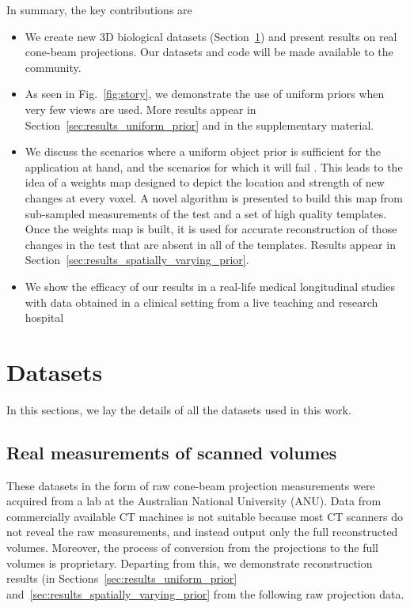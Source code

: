 \documentclass[journal]{IEEEtran}
\begin{document}
In summary, the key contributions are
\begin{itemize}
\item We create new 3D biological datasets (Section~\ref{sec:datasets}) and
  present results on real cone-beam projections. Our datasets and code
  will be made available to the community.
  \item As seen in Fig.~\ref{fig:story}, we demonstrate the use of
    uniform priors when very few views are used. More results appear
    in Section~\ref{sec:results_uniform_prior} and in the
    supplementary material.
  \item We discuss the scenarios where a uniform object prior is
    sufficient for the application at hand, and the scenarios for
    which it will fail . This leads to the idea of a weights map
    designed to depict the location and strength of new changes at
    every voxel. A novel algorithm is presented to build this map from
    sub-sampled measurements of the test and a set of high quality
    templates. Once the weights map is built, it is used for accurate
    reconstruction of those changes in the test that are absent in all
    of the templates. Results appear in
    Section~\ref{sec:results_spatially_varying_prior}.
  \item We show the efficacy of our results in a real-life medical
    longitudinal studies with data obtained in a clinical setting from
    a live teaching and
    research hospital 
\end{itemize}

\section{Datasets}
\label{sec:datasets}
In this sections, we lay the details of all the datasets used in this work.
\subsection{Real measurements of scanned volumes}
These datasets in the form of raw cone-beam projection measurements were acquired from a lab
 at the Australian National University (ANU). Data from commercially
 available CT machines is not suitable because most CT scanners do
 not reveal the raw measurements, and instead output only the full
 reconstructed volumes. Moreover, the process of conversion from the
 projections to the full volumes is proprietary. Departing from this, we
 demonstrate reconstruction results (in Sections~\ref{sec:results_uniform_prior} and~\ref{sec:results_spatially_varying_prior} from the following raw projection data.\\
\end{document}
